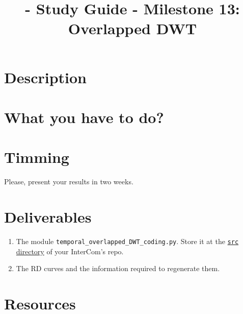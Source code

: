 
\title{\TM{} - Study Guide - Milestone 13: Overlapped DWT}

\maketitle

\section{Description}

\sub
\sub
\section{What you have to do?}


\section{Timming}

Please, present your results in two weeks.

\section{Deliverables}

\begin{enumerate}
\item The module \verb|temporal_overlapped_DWT_coding.py|. Store it at
  the
  \href{https://github.com/Tecnologias-multimedia/intercom/src}{\texttt{src}
    directory} of your InterCom's repo.
\item The RD curves and the information required to regenerate them.
\end{enumerate}
  
\section{Resources}


